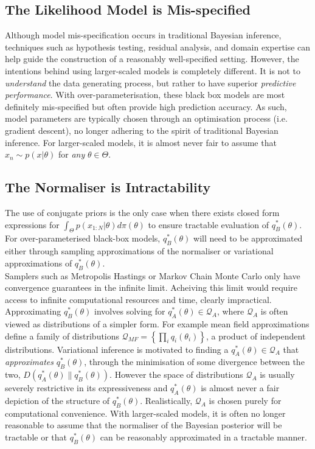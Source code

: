 \documentclass[twoside,11pt]{article}
\begin{document}
\subsection{The Likelihood Model is Mis-specified}
Although model mis-specification occurs in traditional Bayesian inference, techniques such as hypothesis testing, residual analysis, and domain expertise can help guide the construction of a reasonably well-specified setting. However, the intentions behind using larger-scaled models is completely different. It is not to \textit{understand} the data generating process, but rather to have superior \textit{predictive performance}. With over-parameterisation, these black box models are most definitely mis-specified but often provide high prediction accuracy. As such, model parameters are typically chosen through an optimisation process (i.e. gradient descent), no longer adhering to the spirit of traditional Bayesian inference. For larger-scaled models, it is almost never fair to assume that $x_n \sim p(x|\theta)$ for \textit{any} $\theta \in \Theta$.

\subsection{The Normaliser is Intractability}
The use of conjugate priors is the only case when there exists closed form expressions for $\int_{\Theta} p(x_{1:N}|\theta) d \pi(\theta)$ to ensure tractable evaluation of $q_B^*(\theta)$. For over-parameterised black-box models, $q_B^*(\theta)$ will need to be approximated either through sampling approximations of the normaliser or variational approximations of $q_B^*(\theta)$.
\newline
\\Samplers such as Metropolis Hastings or Markov Chain Monte Carlo only have convergence guarantees in the infinite limit. Acheiving this limit would require access to infinite computational resources and time, clearly impractical. 
\newline
\\Approximating $q_B^*(\theta)$ involves solving for $q_A^*(\theta) \in \mathcal{Q}_{A}$, where $\mathcal{Q}_{A}$ is often viewed as distributions of a simpler form. For example mean field approximations define a family of distributions $\mathcal{Q}_{MF} = \left\{\prod_i q_i(\theta_i)\right\}$, a product of independent distributions. Variational inference is motivated to finding a $q_A^*(\theta) \in \mathcal{Q}_{A}$ that \textit{approximates} $q_B^*(\theta)$, through the minimisation of some divergence between the two, $D(q_A^*(\theta)\| q_B^*(\theta))$. However the space of distributions $\mathcal{Q}_{A}$ is usually severely restrictive in its expressiveness and $q_A^*(\theta)$ is almost never a fair depiction of the structure of $q_B^*(\theta)$. Realistically, $\mathcal{Q}_{A}$ is chosen purely for computational convenience. With larger-scaled models, it is often no longer reasonable to assume that the normaliser of the Bayesian posterior will be tractable or that $q_B^*(\theta)$ can be reasonably approximated in a tractable manner.
\end{document}
